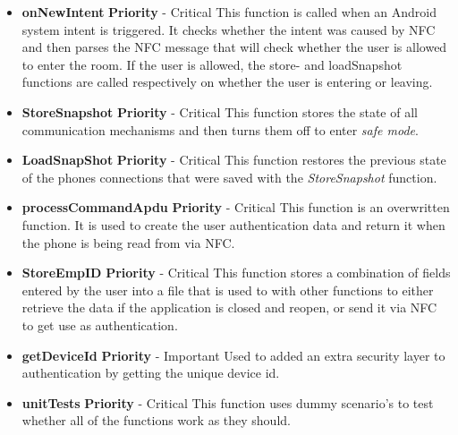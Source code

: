 \documentclass[a4paper,12pt,titlepage]{article}
\begin{document}
		\begin{itemize}
			\item \textbf{onNewIntent}
				\newline\textbf{ Priority } - Critical
				\newline This function is called when an Android system intent is triggered. It checks whether the intent was caused by NFC and then parses the NFC message that will check whether the user is allowed to enter the room. If the user is allowed, the store- and loadSnapshot functions are called respectively on whether the user is entering or leaving.
			\item \textbf{StoreSnapshot}
				\newline\textbf{ Priority } - Critical
				\newline This function stores the state of all communication mechanisms and then turns them off to enter \textit{safe mode}.
			\item \textbf{LoadSnapShot}
				\newline\textbf{ Priority } - Critical
				\newline This function restores the previous state of the phones connections that were saved with the \textit{StoreSnapshot} function.
				\item \textbf{processCommandApdu}
				\newline\textbf{ Priority } - Critical
				\newline This function is an overwritten function. It is used to create the user authentication data and return it when the phone is being read from via NFC.
			\item \textbf{StoreEmpID}
				\newline\textbf{ Priority } - Critical
				\newline This function stores a combination of fields entered by the user into a file that is used to with other functions to either retrieve the data if the application is closed and reopen, or send it via NFC to get use as authentication.
			\item \textbf{getDeviceId}
				\newline\textbf{ Priority } - Important
				\newline Used to added an extra security layer to authentication by getting the unique device id.
			\item \textbf{unitTests}
				\newline\textbf{ Priority } - Critical
				\newline This function uses dummy scenario's to test whether all of the functions work as they should.


\end{itemize}
\end{document}
